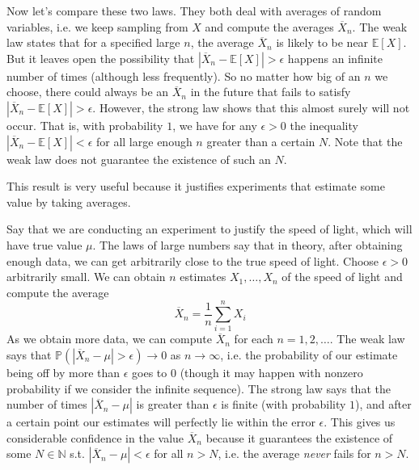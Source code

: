 \documentclass{article}
\begin{document}
    Now let's compare these two laws. They both deal with averages of random variables, i.e. we keep sampling from $X$ and compute the averages $\overline{X}_n$. The weak law states that for a specified large $n$, the average $\overline{X}_n$ is likely to be near $\mathbb{E}[X]$. But it leaves open the possibility that $|\overline{X}_n - \mathbb{E}[X]| > \epsilon$ happens an infinite number of times (although less frequently). So no matter how big of an $n$ we choose, there could always be an $\overline{X}_n$ in the future that fails to satisfy $|\overline{X}_n - \mathbb{E}[X]| > \epsilon$. However, the strong law shows that this almost surely will not occur. That is, with probability $1$, we have for any $\epsilon > 0$ the inequality $|\overline{X}_n - \mathbb{E}[X]| < \epsilon$ for all large enough $n$ greater than a certain $N$. Note that the weak law does not guarantee the existence of such an $N$. 

    This result is very useful because it justifies experiments that estimate some value by taking averages. 

    \begin{example}
      Say that we are conducting an experiment to justify the speed of light, which will have true value $\mu$. The laws of large numbers say that in theory, after obtaining enough data, we can get arbitrarily close to the true speed of light. Choose $\epsilon > 0$ arbitrarily small. We can obtain $n$ estimates $X_1, \ldots, X_n$ of the speed of light and compute the average 
      \begin{equation}
        \overline{X}_n = \frac{1}{n} \sum_{i=1}^n X_i
      \end{equation}
      As we obtain more data, we can compute $\overline{X}_n$ for each $n = 1, 2, \ldots$. The weak law says that $\mathbb{P}(|\overline{X}_n - \mu| > \epsilon) \rightarrow 0$ as $n \rightarrow \infty$, i.e. the probability of our estimate being off by more than $\epsilon$ goes to $0$ (though it may happen with nonzero probability if we consider the infinite sequence). The strong law says that the number of times $|\overline{X}_n - \mu|$ is greater than $\epsilon$ is finite (with probability $1$), and after a certain point our estimates will perfectly lie within the error $\epsilon$. This gives us considerable confidence in the value $\overline{X}_n$ because it guarantees the existence of some $N \in \mathbb{N}$ s.t. $|\overline{X}_n - \mu| < \epsilon$ for all $n > N$, i.e. the average \textit{never} fails for $n > N$. 
    \end{example}
\end{document}
